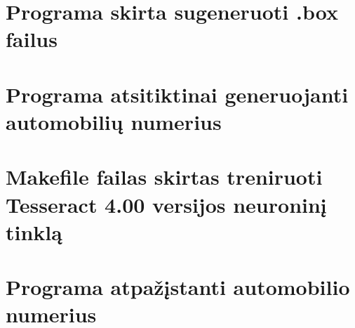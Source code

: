 \documentclass{VUMIFInfBakalaurinis}
\begin{document}
\appendix  %

\section{Programa skirta sugeneruoti .box failus}


\section{Programa atsitiktinai generuojanti automobilių numerius}


\section{Makefile failas skirtas treniruoti Tesseract 4.00 versijos neuroninį tinklą}


\section{Programa atpažįstanti automobilio numerius}

\end{document}
